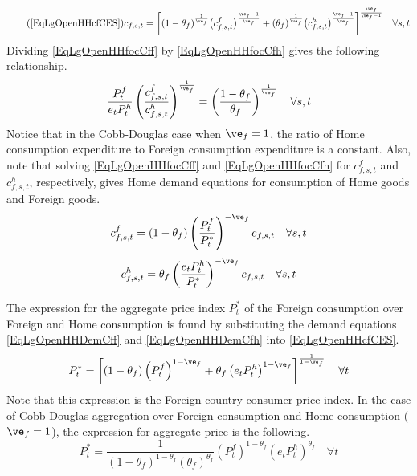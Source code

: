     \begin{equation}\tag{\ref{EqLgOpenHHcfCES}}
      c_{f,s,t}= \biggl[(1 - \theta_f)^\frac{1}{\ve_f}\bigl(c^f_{f,s,t}\bigr)^\frac{\ve_f-1}{\ve_f} + (\theta_f)^\frac{1}{\ve_f}\bigl(c^h_{f,s,t}\bigr)^\frac{\ve_f-1}{\ve_f}\biggr]^\frac{\ve_f}{\ve_f-1} \quad\forall s,t
    \end{equation}
    Dividing \eqref{EqLgOpenHHfocCff} by \eqref{EqLgOpenHHfocCfh} gives the following relationship.
    \begin{equation}\label{EqLgOpenHHFracExpForDom}
      \frac{P^f_t}{e_t P^h_t}\left(\frac{c^f_{f,s,t}}{c^h_{f,s,t}}\right)^{\frac{1}{\ve_f}} = \left(\frac{1-\theta_f}{\theta_f}\right)^{\frac{1}{\ve_f}} \quad\forall s,t
    \end{equation}
    Notice that in the Cobb-Douglas case when $\ve_f=1$, the ratio of Home consumption expenditure to Foreign consumption expenditure is a constant. Also, note that solving \eqref{EqLgOpenHHfocCff} and \eqref{EqLgOpenHHfocCfh} for $c^f_{f,s,t}$ and $c^h_{f,s,t}$, respectively, gives Home demand equations for consumption of Home goods and Foreign goods.
    \begin{equation}\label{EqLgOpenHHDemCff}
          c^f_{f,s,t} = (1-\theta_f)\left(\frac{P^f_t}{P^*_t}\right)^{-\ve_f}c_{f,s,t} \quad\forall s,t
    \end{equation}
    \begin{equation}\label{EqLgOpenHHDemCfh}
          c^h_{f,s,t} = \theta_f \left(\frac{e_t P^h_t}{P^*_t}\right)^{-\ve_f}c_{f,s,t} \quad\forall s,t
    \end{equation}

    The expression for the aggregate price index $P^*_t$ of the Foreign consumption over Foreign and Home consumption is found by substituting the demand equations \eqref{EqLgOpenHHDemCff} and \eqref{EqLgOpenHHDemCfh} into \eqref{EqLgOpenHHcfCES}.
    \begin{equation}\label{EqLgOpenHHaggPrF}
      P^*_t = \left[(1-\theta_f)\left(P^f_t\right)^{1-\ve_f} + \theta_f\left(e_t P^h_t\right)^{1-\ve_f}\right]^{\frac{1}{1-\ve_f}} \quad\forall t
    \end{equation}
    Note that this expression is the Foreign country consumer price index. In the case of Cobb-Douglas aggregation over Foreign consumption and Home consumption ($\ve_f=1$), the expression for aggregate price is the following.
    \begin{equation}\label{EqLgOpenHHaggPrCobbF}
      P^*_t = \frac{1}{(1-\theta_f)^{1-\theta_f}(\theta_f)^{\theta_f}} \left(P^f_t\right)^{1-\theta_f}\left(e_t P^h_t\right)^{\theta_f} \quad\forall t
    \end{equation}


